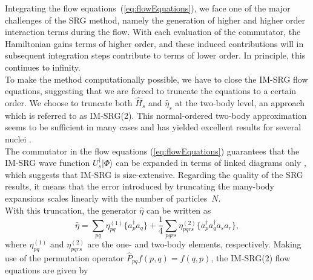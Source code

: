 \documentclass[amsmath, amssymb, aps, floatfix, nofootinbib, preprintnumbers,showpacs, superscriptaddress, twocolumn]{revtex4-1}
\newcommand{\da}{^\dagger}
\newcommand{\llb}{\lbrace}
\newcommand{\rrb}{\rbrace}
\begin{document}
Integrating the flow equations~(\ref{eq:flowEquations}), we face one
of the major challenges of the SRG method, namely the generation of
higher and higher order interaction terms during the flow. With each
evaluation of the commutator, the Hamiltonian gains terms of higher
order, and these induced contributions will in subsequent integration
steps contribute to terms of lower order. In principle, this continues
to infinity.\\ To make the method computationally possible, we have to
close the IM-SRG flow equations, suggesting that we are forced to
truncate the equations to a certain order. We choose to truncate both
$\hat{H}_s$ and $\hat{\eta}_s$ at the two-body level, an approach
which is referred to as IM-SRG(2).  This normal-ordered two-body
approximation seems to be sufficient in many cases and has yielded
excellent results for several nuclei
\cite{PhysRevLett.106.222502,PhysRevLett.109.052501,IMSRG}.\\ The
commutator in the flow equations (\ref{eq:flowEquations}) guarantees
that the IM-SRG wave function $U_s^\dagger|\Phi\rangle$ can be
expanded in terms of linked diagrams only
\cite{shavitt2009many,ISI:A1981MN73700014}, which suggests that IM-SRG
is size-extensive. Regarding the quality of the SRG results, it means
that the error introduced by truncating the many-body expansions
scales linearly with the number of particles~$N$.\\ With this
truncation, the generator $\hat{\eta}$ can be written as
\[
\hat{\eta} = \sum_{pq} \eta_{pq}^{(1)} \llb a_p\da a_q\rrb +
\frac{1}{4}\sum\limits_{pqrs}\eta_{pqrs}^{(2)} \llb a_p\da a_q\da a_s
a_r \rrb,
\]
where $\eta_{pq}^{(1)}$ and $ \eta_{pqrs}^{(2)}$ are the one- and
two-body elements, respectively. Making use of the permutation
operator $ \hat{P}_{pq}f(p,q) = f(q,p)$, the IM-SRG(2) flow equations
are given by
\end{document}
